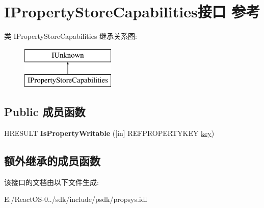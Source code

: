 \hypertarget{interface_i_property_store_capabilities}{}\section{I\+Property\+Store\+Capabilities接口 参考}
\label{interface_i_property_store_capabilities}
类 I\+Property\+Store\+Capabilities 继承关系图\+:\begin{figure}[H]
\begin{center}
\leavevmode
\includegraphics[height=2.000000cm]{interface_i_property_store_capabilities}
\end{center}
\end{figure}
\subsection*{Public 成员函数}
\begin{DoxyCompactItemize}
\item 
\mbox{\label{interface_i_property_store_capabilities_a3e6b15ad21fba8fba9719e6514b7a265}} 
H\+R\+E\+S\+U\+LT {\bfseries Is\+Property\+Writable} (\mbox{[}in\mbox{]} R\+E\+F\+P\+R\+O\+P\+E\+R\+T\+Y\+K\+EY \hyperlink{structkey}{key})
\end{DoxyCompactItemize}
\subsection*{额外继承的成员函数}


该接口的文档由以下文件生成\+:\begin{DoxyCompactItemize}
\item 
E\+:/\+React\+O\+S-\/0../sdk/include/psdk/propsys.\+idl\end{DoxyCompactItemize}
